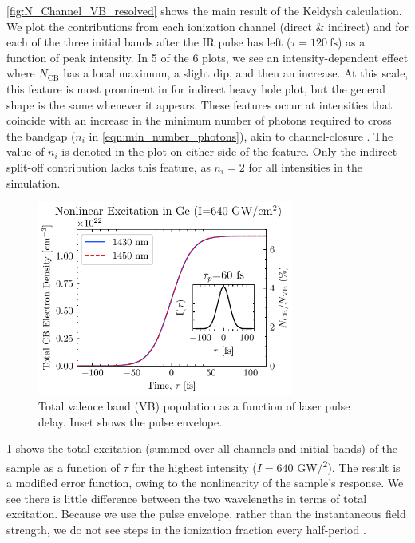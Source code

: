 \cref{fig:N_Channel_VB_resolved} shows the main result of the Keldysh calculation. We plot the contributions from each ionization channel (direct \& indirect) and for each of the three initial bands after the IR pulse has left ($\tau = 120 \ \textrm{fs}$) as a function of peak intensity. In 5 of the 6 plots, we see an intensity-dependent effect where $N_{\textrm{CB}}$ has a local maximum, a slight dip, and then an increase. At this scale, this feature is most prominent in for indirect heavy hole plot, but the general shape is the same whenever it appears. These features occur at intensities that coincide with an increase in the minimum number of photons required to cross the bandgap ($n_i$ in \cref{eqn:min_number_photons}), akin to channel-closure \cite{shcheblanovNonlinearPhotoionizationTransparent2017}. The value of $n_i$ is denoted in the plot on either side of the feature. Only the indirect split-off contribution lacks this feature, as $n_i=2$ for all intensities in the simulation.

\begin{figure}
	\centering
	\includegraphics[width=0.75\textwidth]{figures/chap4/Total_CB_dens_vs_Time.pdf}
	\caption{Total valence band (VB) population as a function of laser pulse delay. Inset shows the pulse envelope.}
	\label{fig:Total_CB_dens_vs_Time}
\end{figure}

\cref{fig:Total_CB_dens_vs_Time} shows the total excitation (summed over all channels and initial bands) of the sample as a function of $\tau$ for the highest intensity ($I = 640$ GW/\textsuperscript{2}). The result is a modified error function, owing to the nonlinearity of the sample's response. We see there is little difference between the two wavelengths in terms of total excitation. Because we use the pulse envelope, rather than the instantaneous field strength, we do not see steps in the ionization fraction every half-period \cite{schultzeAttosecondBandgapDynamics2014}.

